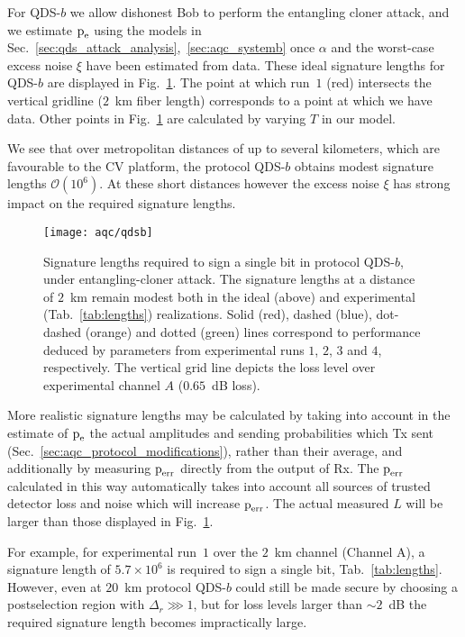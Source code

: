 For QDS-$b$ we allow dishonest Bob to perform the entangling cloner attack, and we estimate $\text{p}_{\text{e}}$ using the models in Sec.~\ref{sec:qds_attack_analysis},~\ref{sec:aqc_systemb} once $\alpha$ and the worst-case excess noise $\xi$ have been estimated from data. These ideal signature lengths for QDS-$b$ are displayed in Fig.~\ref{fig:aqc_qdsb}. The point at which run~$1$ (red) intersects the vertical gridline ($2$~km fiber length) corresponds to a point at which we have data. Other points in Fig.~\ref{fig:aqc_qdsb} are calculated by varying $T$ in our model.

We see that over metropolitan distances of up to several kilometers, which are favourable to the CV platform, the protocol QDS-$b$ obtains modest signature lengths $\mathcal{O}\left(10^6\right)$. At these short distances however the excess noise $\xi$ has strong impact on the required signature lengths.

\begin{figure}[htp]
\captionsetup{width=0.8\linewidth}
\centering
\texttt{[image: aqc/qdsb]}
\caption{\label{fig:aqc_qdsb} Signature lengths required to sign a single bit in protocol QDS-$b$, under entangling-cloner attack. The signature lengths at a distance of $2$~km remain modest both in the ideal (above) and experimental (Tab.~\ref{tab:lengths}) realizations. %
Solid (red), dashed (blue), dot-dashed (orange) and dotted (green) lines correspond to performance deduced by parameters from experimental runs $1$, $2$, $3$ and $4$, respectively. The vertical grid line depicts the loss level over experimental channel $A$ ($0.65$~dB loss).}
\end{figure} %

More realistic signature lengths may be calculated by taking into account in the estimate of $\text{p}_{\text{e}}$ the actual amplitudes and sending probabilities which Tx sent (Sec.~\ref{sec:aqc_protocol_modifications}), rather than their average, and additionally by measuring $\text{p}_{\text{err}}$ directly from the output of Rx. The $\text{p}_{\text{err}}$ calculated in this way automatically takes into account all sources of trusted detector loss and noise which will increase $\text{p}_{\text{err}}$. The actual measured $L$ will be larger than those displayed in Fig.~\ref{fig:aqc_qdsb}. 

For example, for experimental run~$1$ over the $2$~km channel (Channel A), a signature length of $5.7 \times 10^6$ is required to sign a single bit, Tab.~\ref{tab:lengths}. However, even at $20$~km protocol QDS-$b$ could still be made secure by choosing a postselection region with $\Delta_r \ggg 1$, but for loss levels larger than $\sim 2$~dB the required signature length becomes impractically large.

